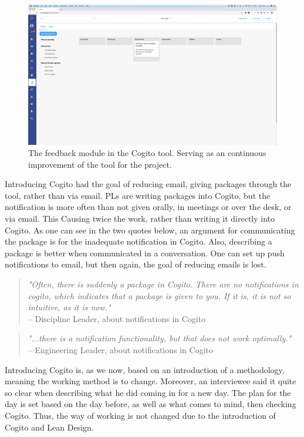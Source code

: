 \begin{figure}
    \centering
    \includegraphics[width=\textwidth]{fig/cogitos_feedback.png}
    \caption{The feedback module in the Cogito tool. Serving as an continuous improvement of the tool for the project.}
    \label{fig:cogito_feedback}
\end{figure}

Introducing Cogito had the goal of reducing email, giving packages through the tool, rather than via email. PLs are writing packages into Cogito, but the notification is more often than not given orally, in meetings or over the desk, or via email. This Causing twice the work, rather than writing it directly into Cogito. As one can see in the two quotes below, an argument for communicating the package is for the inadequate notification in Cogito. Also, describing a package is better when communicated in a conversation. One can set up push notifications to email, but then again, the goal of reducing emails is lost. 

\begin{quote}
    \textit{"Often, there is suddenly a package in Cogito. There are no notifications in cogito, which indicates that a package is given to you. If it is, it is not so intuitive, as it is now."}\\
    – Discipline Leader, about notifications in Cogito
\end{quote}

\begin{quote}
    \textit{"...there is a notification functionality, but that does not work optimally."}\\
    – Engineering Leader, about notifications in Cogito
\end{quote}

Introducing Cogito is, as we now, based on an introduction of a methodology, meaning the working method is to change. Moreover, an interviewee said it quite so clear when describing what he did coming in for a new day. The plan for the day is set based on the day before, as well as what comes to mind, then checking Cogito. Thus, the way of working is not changed due to the introduction of Cogito and Lean Design.


